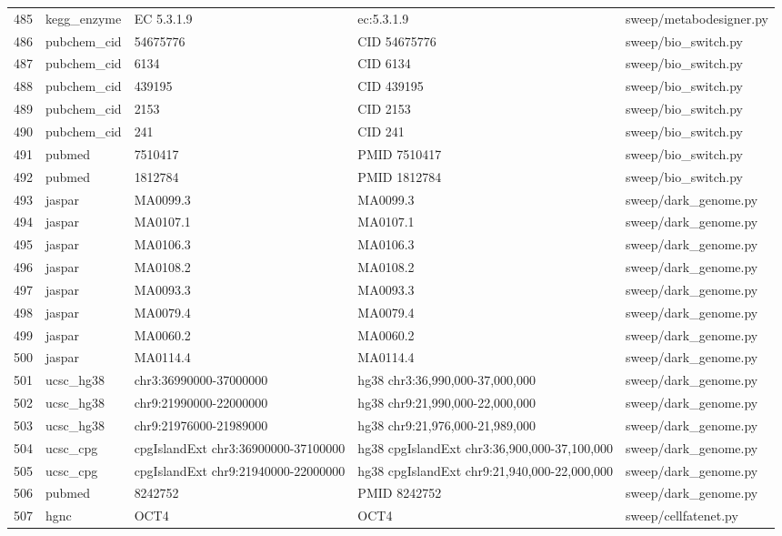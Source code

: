 {\begin{longtable}{rllp{3.2cm}p{4.2cm}}
485 & kegg\_enzyme & EC 5.3.1.9 & ec:5.3.1.9 & sweep/metabodesigner.py\\
486 & pubchem\_cid & 54675776 & CID 54675776 & sweep/bio\_switch.py\\
487 & pubchem\_cid & 6134 & CID 6134 & sweep/bio\_switch.py\\
488 & pubchem\_cid & 439195 & CID 439195 & sweep/bio\_switch.py\\
489 & pubchem\_cid & 2153 & CID 2153 & sweep/bio\_switch.py\\
490 & pubchem\_cid & 241 & CID 241 & sweep/bio\_switch.py\\
491 & pubmed & 7510417 & PMID 7510417 & sweep/bio\_switch.py\\
492 & pubmed & 1812784 & PMID 1812784 & sweep/bio\_switch.py\\
493 & jaspar & MA0099.3 & MA0099.3 & sweep/dark\_genome.py\\
494 & jaspar & MA0107.1 & MA0107.1 & sweep/dark\_genome.py\\
495 & jaspar & MA0106.3 & MA0106.3 & sweep/dark\_genome.py\\
496 & jaspar & MA0108.2 & MA0108.2 & sweep/dark\_genome.py\\
497 & jaspar & MA0093.3 & MA0093.3 & sweep/dark\_genome.py\\
498 & jaspar & MA0079.4 & MA0079.4 & sweep/dark\_genome.py\\
499 & jaspar & MA0060.2 & MA0060.2 & sweep/dark\_genome.py\\
500 & jaspar & MA0114.4 & MA0114.4 & sweep/dark\_genome.py\\
501 & ucsc\_hg38 & chr3:36990000-37000000 & hg38 chr3:36,990,000-37,000,000 & sweep/dark\_genome.py\\
502 & ucsc\_hg38 & chr9:21990000-22000000 & hg38 chr9:21,990,000-22,000,000 & sweep/dark\_genome.py\\
503 & ucsc\_hg38 & chr9:21976000-21989000 & hg38 chr9:21,976,000-21,989,000 & sweep/dark\_genome.py\\
504 & ucsc\_cpg & cpgIslandExt chr3:36900000-37100000 & hg38 cpgIslandExt chr3:36,900,000-37,100,000 & sweep/dark\_genome.py\\
505 & ucsc\_cpg & cpgIslandExt chr9:21940000-22000000 & hg38 cpgIslandExt chr9:21,940,000-22,000,000 & sweep/dark\_genome.py\\
506 & pubmed & 8242752 & PMID 8242752 & sweep/dark\_genome.py\\
507 & hgnc & OCT4 & OCT4 & sweep/cellfatenet.py\\

\end{longtable}}
